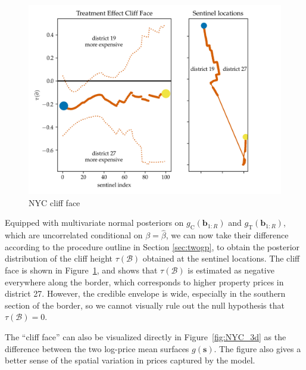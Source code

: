 \documentclass[letter]{article}
\makeatletter
\def\maxwidth{\ifdim\Gin@nat@width>\linewidth\linewidth
\else\Gin@nat@width\fi}
\let\Oldincludegraphics\includegraphics
\renewcommand{\includegraphics}[1]{\Oldincludegraphics[width=0.9\maxwidth]{#1}}
\newcommand{\treat}{\mathrm{T}}
\newcommand{\ctrol}{\mathrm{C}}
\newcommand{\svec}{\mathbold{s}}
\newcommand{\border}{\mathcal{B}}
\newcommand{\sentinel}{\bm{b}}
\newcommand{\numsent}{R}
\newcommand{\sentinels}{\sentinel_{1:\numsent}}
\makeatother
\begin{document}
    	\begin{figure}
\centering
\includegraphics{../NYC/NYC_plots/NYC_cliff_face.png}
\caption{\label{fig:NYC_cliff_face}NYC cliff face}
\end{figure}
    


    	Equipped with multivariate normal posteriors on \(g_\ctrol{}(\sentinels)\) and \(g_\treat{}(\sentinels)\), which are uncorrelated conditional on \(\beta=\hat\beta\), we can now take their difference according to the procedure outline in Section \ref{sec:twogp}, to obtain the posterior distribution of the cliff height \(\tau(\border)\) obtained at the sentinel locations.
The cliff face is shown in Figure~\ref{fig:NYC_cliff_face}, and shows that \(\tau(\border)\) is estimated as negative everywhere along the border, which corresponds to higher property prices in district 27.
However, the credible envelope is wide, especially in the southern section of the border, so we cannot visually rule out the null hypothesis that \(\tau(\border)=0\).

The ``cliff face'' can also be visualized directly in Figure~\ref{fig:NYC_3d} as the difference between the two log-price mean surfaces \(g(\svec)\).
The figure also gives a better sense of the spatial variation in prices captured by the model.
    
\end{document}

